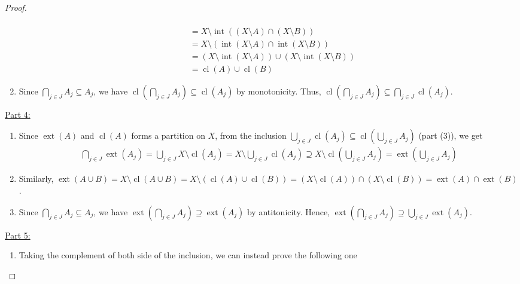 \documentclass{treatise}
\begin{document}
\begin{proof}
\begin{enumerate}[label=(\alph*)]
\begin{align*}
        \\
        & = X \setminus \operatorname{int}((X \setminus A) \cap (X \setminus B))
        \\
        & = X \setminus (\operatorname{int}(X \setminus A) \cap \operatorname{int}(X \setminus B))
        \\
        & = (X \setminus \operatorname{int}(X \setminus A)) \cup (X \setminus \operatorname{int}(X \setminus B))
        \\
        & = \operatorname{cl}(A) \cup \operatorname{cl}(B)
    \end{align*}
    \item Since $\bigcap_{j \in J} A_j \subseteq A_j$, we have $\operatorname{cl} \left( \bigcap_{j \in J} A_j \right) \subseteq \operatorname{cl}(A_j)$ by monotonicity. Thus, $\operatorname{cl} \left( \bigcap_{j \in J} A_j \right) \subseteq \bigcap_{j \in J} \operatorname{cl}(A_j)$.
\end{enumerate}
\underline{Part 4:}
\begin{enumerate}[label=(\alph*)]
    \item Since $\operatorname{ext}(A)$ and $\operatorname{cl}(A)$ forms a partition on $X$, from the inclusion $\bigcup_{j \in J} \operatorname{cl}(A_j) \subseteq \operatorname{cl} \left( \bigcup_{j \in J} A_j \right)$ (part (3)), we get
    \begin{align*}
        \bigcap_{j \in J} \operatorname{ext}(A_j) = \bigcup_{j \in J} X \setminus \operatorname{cl}(A_j) = X \setminus \bigcup_{j \in J} \operatorname{cl}(A_j) \supseteq X \setminus \operatorname{cl} \left( \bigcup_{j \in J} A_j \right) = \operatorname{ext} \left( \bigcup_{j \in J} A_j \right)
    \end{align*}
    \item Similarly, $\operatorname{ext}(A \cup B) = X \setminus \operatorname{cl}(A \cup B) = X \setminus (\operatorname{cl}(A) \cup \operatorname{cl}(B)) = (X \setminus \operatorname{cl}(A)) \cap (X \setminus \operatorname{cl}(B)) = \operatorname{ext}(A) \cap \operatorname{ext}(B)$.
    \item Since $\bigcap_{j \in J} A_j \subseteq A_j$, we have $\operatorname{ext} \left( \bigcap_{j \in J} A_j \right) \supseteq \operatorname{ext} (A_j)$ by antitonicity. Hence, $\operatorname{ext} \left( \bigcap_{j \in J} A_j \right) \supseteq \bigcup_{j \in J} \operatorname{ext} (A_j)$.
\end{enumerate}
\underline{Part 5:}
\begin{enumerate}
    \item Taking the complement of both side of the inclusion, we can instead prove the following one

\end{enumerate}
\end{proof}
\end{document}
